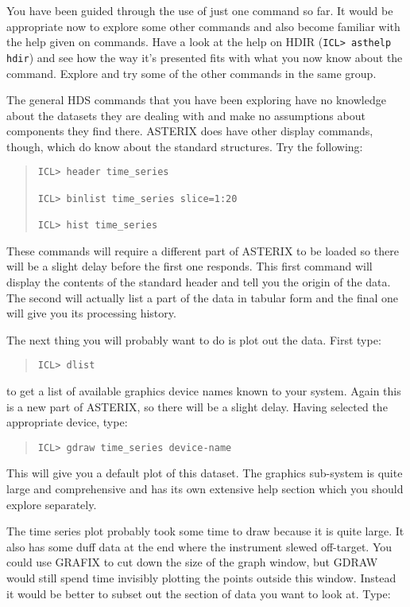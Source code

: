 \documentclass{book}
\renewcommand{\_}{{\tt\char'137}}     %
\begin{document}
You have been guided through the use of just one command so far. It
would be appropriate now to explore some other commands and also
become familiar with the help given on commands. Have a look at the
help on HDIR ({\tt ICL> asthelp hdir}) and see how the way it's presented
fits with what you now know about the command. Explore and try some
of the other commands in the same group.
 
The general HDS commands that you have been exploring have no
knowledge about the datasets they are dealing with and make no
assumptions about components they find there. ASTERIX does have
other display commands, though, which do know about the standard
structures. Try the following:
 
\begin{quote}\begin{verbatim}
ICL> header time_series
 
ICL> binlist time_series slice=1:20
 
ICL> hist time_series
\end{verbatim}\end{quote}
These commands will require a different part of ASTERIX to be loaded
so there will be a slight delay before the first one responds. This
first command will display the contents of the standard header and
tell you the origin of the data. The second will actually list a part
of the data in tabular form and the final one will give you its
processing history.
 
The next thing you will probably want to do is plot out the data. First
type:
 
\begin{quote}\begin{verbatim}
ICL> dlist
\end{verbatim}\end{quote}
to get a list of available graphics device names known to your system.
Again this is a new part of ASTERIX, so there will be a slight delay.
Having selected the appropriate device, type:
 
\begin{quote}\begin{verbatim}
ICL> gdraw time_series device-name
\end{verbatim}\end{quote}
This will give you a default plot of this dataset. The graphics sub-system
is quite large and comprehensive and has its own extensive help section
which you should explore separately.
 
The time series plot probably took some time to draw because it is quite
large. It also has some duff data at the end where the instrument slewed
off-target. You could use GRAFIX to cut down the size of the graph
window, but GDRAW would still spend time invisibly plotting the points
outside this window. Instead it would be better to subset out the
section of data you want to look at. Type:
 
\end{document}

